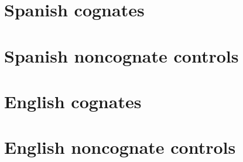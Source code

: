 \label{Appendix::OOC}
\begin{centering}
\section{Spanish cognates}

\section{Spanish noncognate controls}


\section{English cognates}

\section{English noncognate controls}

\end{centering}
